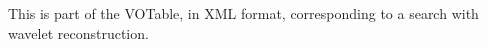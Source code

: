 %
%
%
%
\label{app-votable}
This is part of the VOTable, in XML format, corresponding to a search
with wavelet reconstruction.

